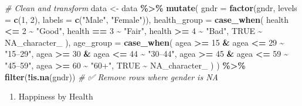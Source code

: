 \documentclass[
]{article}
\newenvironment{Shaded}{\begin{snugshade}}{\end{snugshade}}
\newcommand{\AttributeTok}[1]{\textcolor[rgb]{0.13,0.29,0.53}{#1}}
\newcommand{\CommentTok}[1]{\textcolor[rgb]{0.56,0.35,0.01}{\textit{#1}}}
\newcommand{\ConstantTok}[1]{\textcolor[rgb]{0.56,0.35,0.01}{#1}}
\newcommand{\DecValTok}[1]{\textcolor[rgb]{0.00,0.00,0.81}{#1}}
\newcommand{\FunctionTok}[1]{\textcolor[rgb]{0.13,0.29,0.53}{\textbf{#1}}}
\newcommand{\NormalTok}[1]{#1}
\newcommand{\OtherTok}[1]{\textcolor[rgb]{0.56,0.35,0.01}{#1}}
\newcommand{\SpecialCharTok}[1]{\textcolor[rgb]{0.81,0.36,0.00}{\textbf{#1}}}
\newcommand{\StringTok}[1]{\textcolor[rgb]{0.31,0.60,0.02}{#1}}
\providecommand{\tightlist}{%
  \setlength{\itemsep}{0pt}\setlength{\parskip}{0pt}}
\begin{document}
\begin{Shaded}
\begin{Highlighting}[]
\CommentTok{\# Clean and transform}
\NormalTok{data }\OtherTok{\textless{}{-}}\NormalTok{ data }\SpecialCharTok{\%\textgreater{}\%}
  \FunctionTok{mutate}\NormalTok{(}
    \AttributeTok{gndr =} \FunctionTok{factor}\NormalTok{(gndr, }\AttributeTok{levels =} \FunctionTok{c}\NormalTok{(}\DecValTok{1}\NormalTok{, }\DecValTok{2}\NormalTok{), }\AttributeTok{labels =} \FunctionTok{c}\NormalTok{(}\StringTok{"Male"}\NormalTok{, }\StringTok{"Female"}\NormalTok{)),}
    \AttributeTok{health\_group =} \FunctionTok{case\_when}\NormalTok{(}
\NormalTok{      health }\SpecialCharTok{\textless{}=} \DecValTok{2} \SpecialCharTok{\textasciitilde{}} \StringTok{"Good"}\NormalTok{,}
\NormalTok{      health }\SpecialCharTok{==} \DecValTok{3} \SpecialCharTok{\textasciitilde{}} \StringTok{"Fair"}\NormalTok{,}
\NormalTok{      health }\SpecialCharTok{\textgreater{}=} \DecValTok{4} \SpecialCharTok{\textasciitilde{}} \StringTok{"Bad"}\NormalTok{,}
      \ConstantTok{TRUE} \SpecialCharTok{\textasciitilde{}} \ConstantTok{NA\_character\_}
\NormalTok{    ),}
    \AttributeTok{age\_group =} \FunctionTok{case\_when}\NormalTok{(}
\NormalTok{      agea }\SpecialCharTok{\textgreater{}=} \DecValTok{15} \SpecialCharTok{\&}\NormalTok{ agea }\SpecialCharTok{\textless{}=} \DecValTok{29} \SpecialCharTok{\textasciitilde{}} \StringTok{"15–29"}\NormalTok{,}
\NormalTok{      agea }\SpecialCharTok{\textgreater{}=} \DecValTok{30} \SpecialCharTok{\&}\NormalTok{ agea }\SpecialCharTok{\textless{}=} \DecValTok{44} \SpecialCharTok{\textasciitilde{}} \StringTok{"30–44"}\NormalTok{,}
\NormalTok{      agea }\SpecialCharTok{\textgreater{}=} \DecValTok{45} \SpecialCharTok{\&}\NormalTok{ agea }\SpecialCharTok{\textless{}=} \DecValTok{59} \SpecialCharTok{\textasciitilde{}} \StringTok{"45–59"}\NormalTok{,}
\NormalTok{      agea }\SpecialCharTok{\textgreater{}=} \DecValTok{60} \SpecialCharTok{\textasciitilde{}} \StringTok{"60+"}\NormalTok{,}
      \ConstantTok{TRUE} \SpecialCharTok{\textasciitilde{}} \ConstantTok{NA\_character\_}
\NormalTok{    )}
\NormalTok{  ) }\SpecialCharTok{\%\textgreater{}\%}
  \FunctionTok{filter}\NormalTok{(}\SpecialCharTok{!}\FunctionTok{is.na}\NormalTok{(gndr))  }\CommentTok{\# ✅ Remove rows where gender is NA}
\end{Highlighting}
\end{Shaded}

\begin{enumerate}
\def\labelenumi{\arabic{enumi}.}
\tightlist
\item
  Happiness by Health
\end{enumerate}
\end{document}
